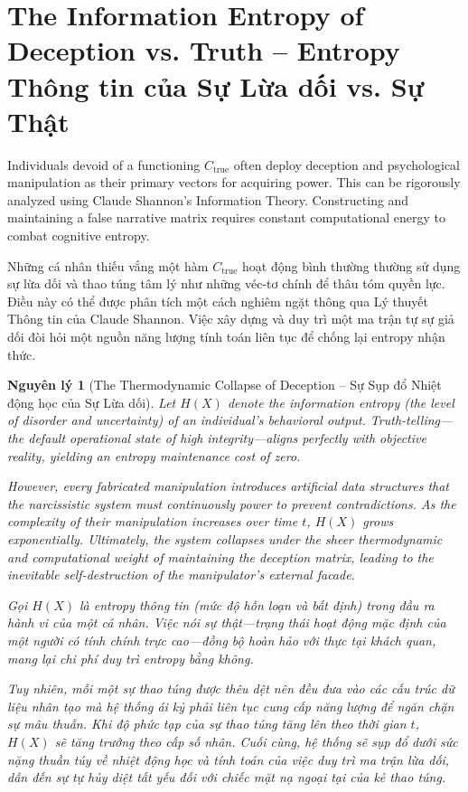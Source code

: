 \documentclass{report}
\newtheorem{nguyenly}{Nguyên lý}
\begin{document}
\section{The Information Entropy of Deception vs. Truth -- Entropy Thông tin của Sự Lừa dối vs. Sự Thật}

Individuals devoid of a functioning $C_{\text{true}}$ often deploy deception and psychological manipulation as their primary vectors for acquiring power. This can be rigorously analyzed using Claude Shannon's Information Theory. Constructing and maintaining a false narrative matrix requires constant computational energy to combat cognitive entropy.

Những cá nhân thiếu vắng một hàm $C_{\text{true}}$ hoạt động bình thường thường sử dụng sự lừa dối và thao túng tâm lý như những véc-tơ chính để thâu tóm quyền lực. Điều này có thể được phân tích một cách nghiêm ngặt thông qua Lý thuyết Thông tin của Claude Shannon. Việc xây dựng và duy trì một ma trận tự sự giả dối đòi hỏi một nguồn năng lượng tính toán liên tục để chống lại entropy nhận thức.

\begin{nguyenly}[The Thermodynamic Collapse of Deception -- Sự Sụp đổ Nhiệt động học của Sự Lừa dối]
	Let $H(X)$ denote the information entropy (the level of disorder and uncertainty) of an individual's behavioral output. Truth-telling—the default operational state of high integrity—aligns perfectly with objective reality, yielding an entropy maintenance cost of zero. 
	
	However, every fabricated manipulation introduces artificial data structures that the narcissistic system must continuously power to prevent contradictions. As the complexity of their manipulation increases over time $t$, $H(X)$ grows exponentially. Ultimately, the system collapses under the sheer thermodynamic and computational weight of maintaining the deception matrix, leading to the inevitable self-destruction of the manipulator's external facade.
	
	Gọi $H(X)$ là entropy thông tin (mức độ hỗn loạn và bất định) trong đầu ra hành vi của một cá nhân. Việc nói sự thật—trạng thái hoạt động mặc định của một người có tính chính trực cao—đồng bộ hoàn hảo với thực tại khách quan, mang lại chi phí duy trì entropy bằng không.
	
	Tuy nhiên, mỗi một sự thao túng được thêu dệt nên đều đưa vào các cấu trúc dữ liệu nhân tạo mà hệ thống ái kỷ phải liên tục cung cấp năng lượng để ngăn chặn sự mâu thuẫn. Khi độ phức tạp của sự thao túng tăng lên theo thời gian $t$, $H(X)$ sẽ tăng trưởng theo cấp số nhân. Cuối cùng, hệ thống sẽ sụp đổ dưới sức nặng thuần túy về nhiệt động học và tính toán của việc duy trì ma trận lừa dối, dẫn đến sự tự hủy diệt tất yếu đối với chiếc mặt nạ ngoại tại của kẻ thao túng.
\end{nguyenly}
\end{document}
